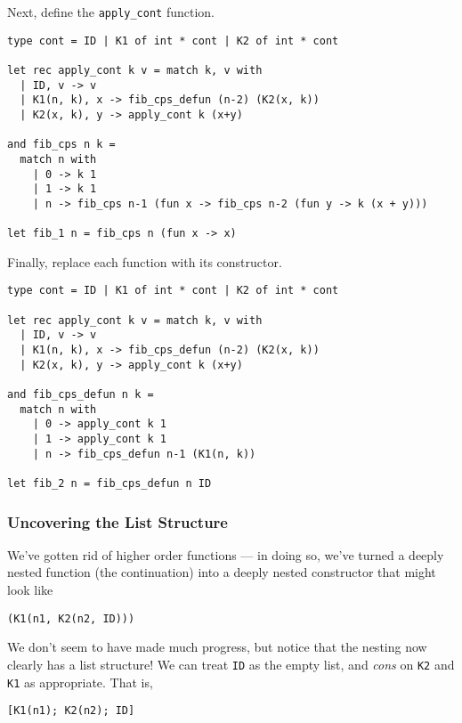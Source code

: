 Next, define the \texttt{apply\_cont} function. 

\begin{code}
\label{code:defun-fib-1}
\begin{verbatim}
type cont = ID | K1 of int * cont | K2 of int * cont

let rec apply_cont k v = match k, v with
  | ID, v -> v
  | K1(n, k), x -> fib_cps_defun (n-2) (K2(x, k))
  | K2(x, k), y -> apply_cont k (x+y)

and fib_cps n k = 
  match n with
    | 0 -> k 1
    | 1 -> k 1
    | n -> fib_cps n-1 (fun x -> fib_cps n-2 (fun y -> k (x + y)))

let fib_1 n = fib_cps n (fun x -> x)
\end{verbatim}
\end{code}

Finally, replace each function with its constructor. 

\begin{code}
\label{code:defun-fib-1}
\begin{verbatim}
type cont = ID | K1 of int * cont | K2 of int * cont

let rec apply_cont k v = match k, v with
  | ID, v -> v
  | K1(n, k), x -> fib_cps_defun (n-2) (K2(x, k))
  | K2(x, k), y -> apply_cont k (x+y)

and fib_cps_defun n k = 
  match n with
    | 0 -> apply_cont k 1
    | 1 -> apply_cont k 1
    | n -> fib_cps_defun n-1 (K1(n, k))

let fib_2 n = fib_cps_defun n ID
\end{verbatim}
\end{code}

\subsubsection{Uncovering the List Structure}
We've gotten rid of higher order functions --- in doing so, we've turned a deeply nested function (the continuation) into a deeply nested constructor that might look like
\begin{verbatim}
(K1(n1, K2(n2, ID)))
\end{verbatim}
We don't seem to have made much progress, but notice that the nesting now clearly has a list structure! We can treat \texttt{ID} as the empty list, and \emph{cons} on \texttt{K2} and \texttt{K1} as appropriate. That is, 
\begin{verbatim}
[K1(n1); K2(n2); ID]
\end{verbatim}

